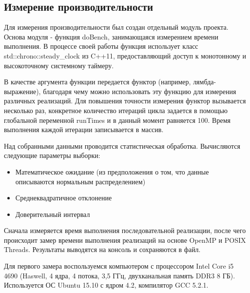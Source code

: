 \subsection{Измерение производительности}

Для измерения производительности был создан отдельный модуль проекта. Основа модуля - функция doBench, занимающаяся измерением времени выполнения. В процессе своей работы функция использует класс std::chrono::steady\_clock из C++11, предоставляющий доступ к монотонному и высокоточному системному таймеру.

В качестве аргумента функции передается функтор (например, лямбда-выражение), благодаря чему можно использовать эту функцию для измерения различных реализаций. Для повышения точности измерения функтор вызывается несколько раз, конкретное количество итераций цикла задается в помощью глобальной переменной runTimes и в данный момент равняется 100. Время выполнения каждой итерации записывается в массив.

% 

Над собранными данными проводится статистическая обработка. Вычисляются следующие параметры выборки:
\begin{itemize}
	\item Математическое ожидание (из предположения о том, что данные описываются нормальным распределением)
	\item Среднеквадратичное отклонение
	\item Доверительный интервал
\end{itemize}

% 

Сначала измеряется время выполнения последовательной реализации, после чего происходит замер времени выполнения реализаций на основе OpenMP и POSIX Threads. Результаты выводятся на консоль и сохраняются в файл.

% 

Для первого замера воспользуемся компьютером с процессором Intel Core i5 4690 (Haswell, 4 ядра, 4 потока, 3,5 ГГц, двухканальная память DDR3 8 ГБ). Используется ОС Ubuntu 15.10 с ядром 4.2, компилятор GCC 5.2.1.

\begin{figure}[H]
	\centering
	\caption{}
\end{figure}

